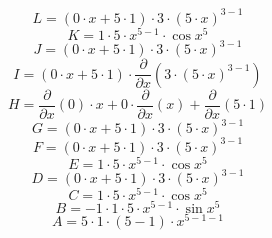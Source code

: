 \documentclass[12pt]{article}
\begin{document}
\begin{equation}
	L = 
\left( 0\cdot x + 5\cdot 1\right) \cdot 3\cdot \left( 5\cdot x\right) ^{3 - 1}
\end{equation}
\begin{equation}
	K = 
1\cdot 5\cdot x^{5 - 1}\cdot \cos {x^{5}}
\end{equation}
\begin{equation}
	J = 
\left( 0\cdot x + 5\cdot 1\right) \cdot 3\cdot \left( 5\cdot x\right) ^{3 - 1}
\end{equation}
\begin{equation}
	I = 
\left( 0\cdot x + 5\cdot 1\right) \cdot \frac{\partial}{\partial x}\left( 3\cdot \left( 5\cdot x\right) ^{3 - 1}\right) 
\end{equation}
\begin{equation}
	H = 
\frac{\partial}{\partial x}\left( 0\right) \cdot x + 0\cdot \frac{\partial}{\partial x}\left( x\right)  + \frac{\partial}{\partial x}\left( 5\cdot 1\right) 
\end{equation}
\begin{equation}
	G = 
\left( 0\cdot x + 5\cdot 1\right) \cdot 3\cdot \left( 5\cdot x\right) ^{3 - 1}
\end{equation}
\begin{equation}
	F = 
\left( 0\cdot x + 5\cdot 1\right) \cdot 3\cdot \left( 5\cdot x\right) ^{3 - 1}
\end{equation}
\begin{equation}
	E = 
1\cdot 5\cdot x^{5 - 1}\cdot \cos {x^{5}}
\end{equation}
\begin{equation}
	D = 
\left( 0\cdot x + 5\cdot 1\right) \cdot 3\cdot \left( 5\cdot x\right) ^{3 - 1}
\end{equation}
\begin{equation}
	C = 
1\cdot 5\cdot x^{5 - 1}\cdot \cos {x^{5}}
\end{equation}
\begin{equation}
	B = 
-1\cdot 1\cdot 5\cdot x^{5 - 1}\cdot \sin {x^{5}}
\end{equation}
\begin{equation}
	A = 
5\cdot 1\cdot \left( 5 - 1\right) \cdot x^{5 - 1 - 1}
\end{equation}
\end{document}
